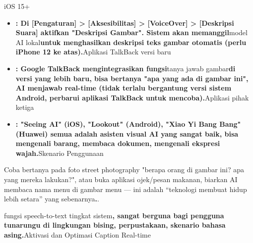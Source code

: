 \begin{tcbinfo}{iOS 15+}
\begin{itemize}
  \item \textbf{: Di [Pengaturan] > [Aksesibilitas] > [VoiceOver] > [Deskripsi Suara] aktifkan "Deskripsi Gambar". Sistem akan memanggil}model AI lokal\textbf{untuk menghasilkan deskripsi teks gambar otomatis (perlu iPhone 12 ke atas).}Aplikasi TalkBack versi baru
  \item \textbf{: Google TalkBack mengintegrasikan fungsi}tanya jawab gambar\textbf{di versi yang lebih baru, bisa bertanya "apa yang ada di gambar ini", AI menjawab real-time (tidak terlalu bergantung versi sistem Android, perbarui aplikasi TalkBack untuk mencoba).}Aplikasi pihak ketiga
  \item \textbf{: "Seeing AI" (iOS), "Lookout" (Android), "Xiao Yi Bang Bang" (Huawei) semua adalah asisten visual AI yang sangat baik, bisa mengenali barang, membaca dokumen, mengenali ekspresi wajah.}Skenario Penggunaan
\end{itemize}

\end{tcbinfo}

\begin{tcbpractice}{Coba bertanya pada foto street photography "berapa orang di gambar ini? apa yang mereka lakukan?", atau buka aplikasi ojek/pesan makanan, biarkan AI membaca nama menu di gambar menu —}
ini adalah “teknologi membuat hidup lebih setara” yang sebenarnya\textbf{.}.

\end{tcbpractice}


fungsi speech-to-text tingkat sistem\textbf{, sangat berguna bagi pengguna tunarungu di lingkungan bising, perpustakaan, skenario bahasa asing.}Aktivasi dan Optimasi Caption Real-time

